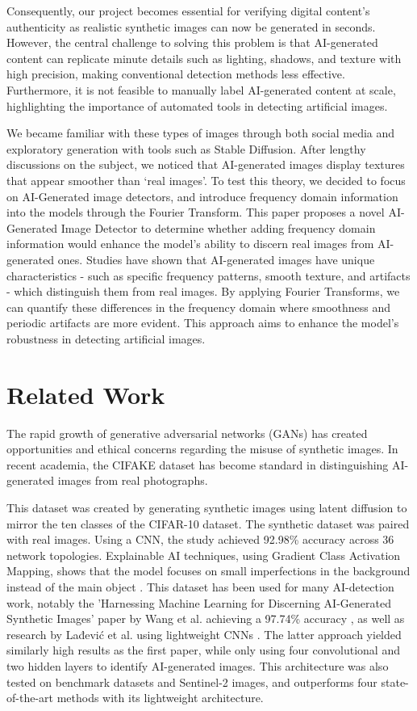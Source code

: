 Consequently, our project becomes essential for verifying digital content's authenticity as realistic synthetic images can now be generated in seconds. However, the central challenge to solving this problem is that AI-generated content can replicate minute details such as lighting, shadows, and texture with high precision, making conventional detection methods less effective. Furthermore, it is not feasible to manually label AI-generated content at scale, highlighting the importance of automated tools in detecting artificial images.

We became familiar with these types of images through both social media and exploratory generation with tools such as Stable Diffusion. After lengthy discussions on the subject, we noticed that AI-generated images display textures that appear smoother than ‘real images’. To test this theory, we decided to focus on AI-Generated image detectors, and introduce frequency domain information into the models through the Fourier Transform. This paper proposes a novel AI-Generated Image Detector to determine whether adding frequency domain information would enhance the model’s ability to discern real images from AI-generated ones. Studies have shown that AI-generated images have unique characteristics - such as specific frequency patterns, smooth texture, and artifacts - which distinguish them from real images. By applying Fourier Transforms, we can quantify these differences in the frequency domain where smoothness and periodic artifacts are more evident. This approach aims to enhance the model's robustness in detecting artificial images.

\section{Related Work}

The rapid growth of generative adversarial networks (GANs) has created opportunities and ethical concerns regarding the misuse of synthetic images. In recent academia, the CIFAKE dataset has become standard in distinguishing AI-generated images from real photographs.

This dataset was created by generating synthetic images using latent diffusion to mirror the ten classes of the CIFAR-10 dataset. The synthetic dataset was paired with real images. Using a CNN, the study achieved 92.98\% accuracy across 36 network topologies. Explainable AI techniques, using Gradient Class Activation Mapping, shows that the model focuses on small imperfections in the background instead of the main object \cite{1}\cite{2}. This dataset has been used for many AI-detection work, notably the 'Harnessing Machine Learning for Discerning AI-Generated Synthetic Images' paper by Wang et al. achieving a 97.74\% accuracy \cite{3}, as well as research by Lađević et al. using lightweight CNNs \cite{4}. The latter approach yielded similarly high results as the first paper, while only using four convolutional and two hidden layers to identify AI-generated images. This architecture was also tested on benchmark datasets and Sentinel-2 images, and outperforms four state-of-the-art methods with its lightweight architecture.

